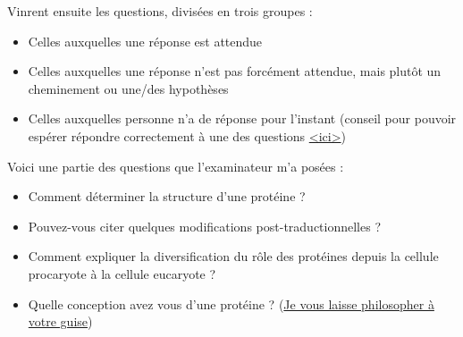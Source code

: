 \bigskip


Vinrent ensuite les questions, divisées en trois groupes :
\begin{itemize}
    \item Celles auxquelles une réponse est attendue
    \item Celles auxquelles une réponse n’est pas forcément attendue, mais plutôt un cheminement ou une/des  hypothèses
    \item Celles auxquelles personne n’a de réponse pour l’instant (conseil pour pouvoir espérer répondre correctement à une des questions \href{https://www.youtube.com/watch?v=4xmCe_PQybE}{<ici>})
\end{itemize}

\vspace{.5cm}


Voici une partie des questions que l’examinateur m’a posées :
\begin{itemize}
    \item Comment déterminer la structure d’une protéine ?
    \item Pouvez-vous citer quelques modifications post-traductionnelles ?
    \item Comment expliquer la diversification du rôle des protéines depuis la cellule procaryote à la cellule eucaryote ? 
    \item Quelle conception avez vous d’une protéine ? (\href{https://drive.google.com/file/d/1yT1XqiO7yJkoMji1EzFvYaB0gDA03Eax/view?usp=sharing}{Je vous laisse philosopher à votre guise})
\end{itemize}



\newpage